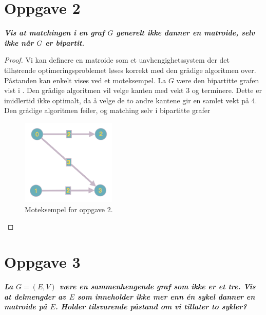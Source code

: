 \documentclass[12pt]{article}
\begin{document}
\section{Oppgave 2}
\it{\textbf{Vis at matchingen i en graf $G$ generelt ikke danner en matroide, selv ikke når $G$ er bipartit.}}

\begin{proof}
Vi kan definere en matroide som et uavhengighetssystem der det tilhørende optimeringsproblemet løses korrekt med den grådige algoritmen over. Påstanden kan enkelt vises ved et moteksempel. La $G$ være den bipartitte grafen vist i . Den grådige algoritmen vil velge kanten med vekt 3 og terminere. Dette er imidlertid ikke optimalt, da å velge de to andre kantene gir en samlet vekt på 4. Den grådige algoritmen feiler, og matching selv i bipartitte grafer
\begin{figure}[ht]
  \begin{center}
  	\includegraphics[width = 0.4\textwidth]{bipartite.png}
    \caption{Moteksempel for oppgave 2.}
    \label{moteksempel}
  \end{center}
\end{figure}
\end{proof}

\section{Oppgave 3}
\it{\textbf{La $G = (E, V)$ være en sammenhengende graf som ikke er et tre. Vis at delmengder av $E$ som inneholder ikke mer enn én sykel danner en matroide på $E$. Holder tilsvarende påstand om vi tillater to sykler?}}
\end{document}
